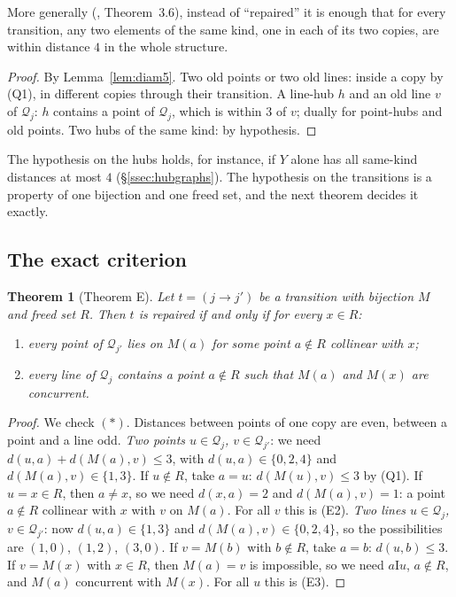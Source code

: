 \documentclass[11pt]{amsart}
\newtheorem{theorem}{Theorem}[section]
\theoremstyle{definition}
\theoremstyle{remark}
\newcommand{\I}{\mathrel{\mathrm{I}}}
\newcommand{\cQ}{\mathcal{Q}}
\begin{document}
More generally (, Theorem~3.6), instead of ``repaired'' it is enough that for every transition, any two elements of the same kind, one in each of its two copies, are within distance $4$ in the whole structure.

\begin{proof}
By Lemma~\ref{lem:diam5}. Two old points or two old lines: inside a copy by (Q1), in different copies through their transition. A line-hub $h$ and an old line $v$ of $\cQ_j$: $h$ contains a point of $\cQ_j$, which is within $3$ of $v$; dually for point-hubs and old points. Two hubs of the same kind: by hypothesis.
\end{proof}

The hypothesis on the hubs holds, for instance, if $Y$ alone has all same-kind distances at most $4$ (\S\ref{ssec:hubgraphs}). The hypothesis on the transitions is a property of one bijection and one freed set, and the next theorem decides it exactly.

\subsection{The exact criterion}\label{ssec:thmE}

\begin{theorem}[Theorem E]\label{thm:E}
Let $t=(j\to j')$ be a transition with bijection $M$ and freed set $R$. Then $t$ is repaired if and only if for every $x\in R$:
\begin{enumerate}[label=\textup{(E\arabic*)},leftmargin=3em,start=2]
\item every point of $\cQ_{j'}$ lies on $M(a)$ for some point $a\notin R$ collinear with $x$;
\item every line of $\cQ_j$ contains a point $a\notin R$ such that $M(a)$ and $M(x)$ are concurrent.
\end{enumerate}
\end{theorem}

\begin{proof}
We check $(\ast)$. Distances between points of one copy are even, between a point and a line odd. \emph{Two points $u\in\cQ_j$, $v\in\cQ_{j'}$}: we need $d(u,a)+d(M(a),v)\le3$, with $d(u,a)\in\{0,2,4\}$ and $d(M(a),v)\in\{1,3\}$. If $u\notin R$, take $a=u$: $d(M(u),v)\le 3$ by (Q1). If $u=x\in R$, then $a\ne x$, so we need $d(x,a)=2$ and $d(M(a),v)=1$: a point $a\notin R$ collinear with $x$ with $v$ on $M(a)$. For all $v$ this is (E2). \emph{Two lines $u\in\cQ_j$, $v\in\cQ_{j'}$}: now $d(u,a)\in\{1,3\}$ and $d(M(a),v)\in\{0,2,4\}$, so the possibilities are $(1,0)$, $(1,2)$, $(3,0)$. If $v=M(b)$ with $b\notin R$, take $a=b$: $d(u,b)\le3$. If $v=M(x)$ with $x\in R$, then $M(a)=v$ is impossible, so we need $a\I u$, $a\notin R$, and $M(a)$ concurrent with $M(x)$. For all $u$ this is (E3).
\end{proof}
\end{document}
